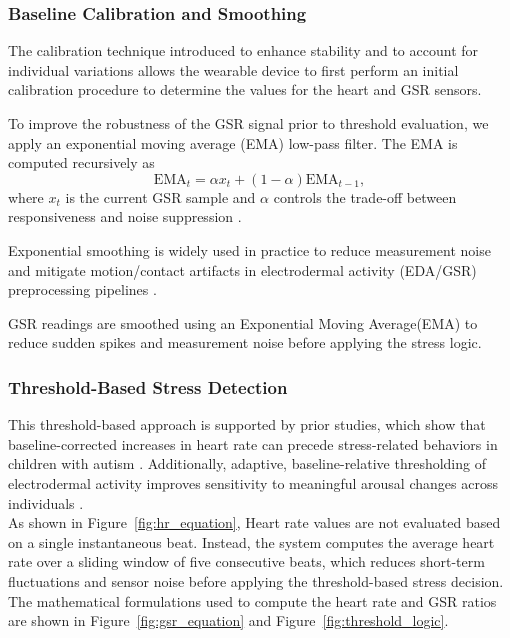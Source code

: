 \documentclass[a4paper,12pt]{report}
\begin{document}
\subsubsection{Baseline Calibration and Smoothing}
The calibration technique introduced to enhance stability and to account for individual variations allows the wearable device to first perform an initial calibration procedure to determine the values for the heart and GSR sensors.

To improve the robustness of the GSR signal prior to threshold evaluation, we apply an exponential moving average (EMA) low-pass filter. The EMA is computed recursively as
\begin{equation}
\mathrm{EMA}_t = \alpha x_t + (1-\alpha)\mathrm{EMA}_{t-1},
\end{equation}
where $x_t$ is the current GSR sample and $\alpha$ controls the trade-off between responsiveness and noise suppression \cite{NIST_ES}.

Exponential smoothing is widely used in practice to reduce measurement noise and mitigate motion/contact artifacts in electrodermal activity (EDA/GSR) preprocessing pipelines \cite{PosadaChon2020}.

GSR readings are smoothed using an Exponential Moving Average(EMA) to reduce sudden spikes and measurement noise before applying the stress logic.
\subsubsection{Threshold-Based Stress Detection}
This threshold-based approach is supported by prior studies, which show that baseline-corrected increases in heart rate can precede stress-related behaviors in children with autism \cite{hr_stress_asd_2019}. Additionally, adaptive, baseline-relative thresholding of electrodermal activity improves sensitivity to meaningful arousal changes across individuals \cite{eda_baseline_threshold_2023}. \\[0.1cm]

As shown in Figure~\ref{fig:hr_equation}, Heart rate values are not evaluated based on a single instantaneous beat. Instead, the system computes the average heart rate over a sliding window of five consecutive beats, which reduces short-term fluctuations and sensor noise before applying the threshold-based stress decision. The mathematical formulations used to compute the heart rate and GSR ratios are shown in Figure~\ref{fig:gsr_equation} and Figure~\ref{fig:threshold_logic}.
\end{document}
